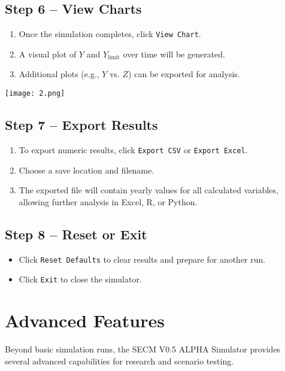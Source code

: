 \documentclass[12pt,a4paper]{article}
\begin{document}
\subsection{Step 6 – View Charts}
\begin{enumerate}
    \item Once the simulation completes, click \texttt{View Chart}.
    \item A visual plot of \(Y\) and \(Y_{\text{limit}}\) over time will be generated.
    \item Additional plots (e.g., \(Y\) vs. \(Z\)) can be exported for analysis.
\end{enumerate}

\begin{center}
    \texttt{[image: 2.png]}
\end{center}

\subsection{Step 7 – Export Results}
\begin{enumerate}
    \item To export numeric results, click \texttt{Export CSV} or \texttt{Export Excel}.
    \item Choose a save location and filename.
    \item The exported file will contain yearly values for all calculated variables, allowing further analysis in Excel, R, or Python.
\end{enumerate}

\subsection{Step 8 – Reset or Exit}
\begin{itemize}
    \item Click \texttt{Reset Defaults} to clear results and prepare for another run.
    \item Click \texttt{Exit} to close the simulator.
\end{itemize}


\newpage
\section{Advanced Features}

Beyond basic simulation runs, the SECM V0.5 ALPHA Simulator provides several advanced capabilities for research and scenario testing.
\end{document}
